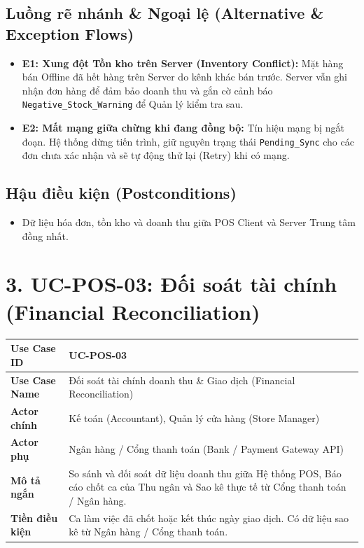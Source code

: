 \documentclass[11pt,a4paper]{article}
\begin{document}
	\subsection*{Luồng rẽ nhánh \& Ngoại lệ (Alternative \& Exception Flows)}
	\begin{itemize}
		\item \textbf{E1: Xung đột Tồn kho trên Server (Inventory Conflict):} Mặt hàng bán Offline đã hết hàng trên Server do kênh khác bán trước. Server vẫn ghi nhận đơn hàng để đảm bảo doanh thu và gắn cờ cảnh báo \texttt{Negative\_Stock\_Warning} để Quản lý kiểm tra sau.
		\item \textbf{E2: Mất mạng giữa chừng khi đang đồng bộ:} Tín hiệu mạng bị ngắt đoạn. Hệ thống dừng tiến trình, giữ nguyên trạng thái \texttt{Pending\_Sync} cho các đơn chưa xác nhận và sẽ tự động thử lại (Retry) khi có mạng.
	\end{itemize}
	
	\subsection*{Hậu điều kiện (Postconditions)}
	\begin{itemize}
		\item Dữ liệu hóa đơn, tồn kho và doanh thu giữa POS Client và Server Trung tâm đồng nhất.
	\end{itemize}
	
	\vspace{1.5em}
	
	\section{3. UC-POS-03: Đối soát tài chính (Financial Reconciliation)}
	
	\begin{tabularx}{\textwidth}{|>{\bfseries\color{secondary}}p{3.5cm}|X|}
		\hline
		\rowcolor{tablehead} Use Case ID & UC-POS-03 \\ \hline
		Use Case Name & Đối soát tài chính doanh thu \& Giao dịch (Financial Reconciliation) \\ \hline
		Actor chính & Kế toán (Accountant), Quản lý cửa hàng (Store Manager) \\ \hline
		Actor phụ & Ngân hàng / Cổng thanh toán (Bank / Payment Gateway API) \\ \hline
		Mô tả ngắn & So sánh và đối soát dữ liệu doanh thu giữa Hệ thống POS, Báo cáo chốt ca của Thu ngân và Sao kê thực tế từ Cổng thanh toán / Ngân hàng. \\ \hline
		Tiền điều kiện & Ca làm việc đã chốt hoặc kết thúc ngày giao dịch. Có dữ liệu sao kê từ Ngân hàng / Cổng thanh toán. \\ \hline
	\end{tabularx}
	
\end{document}
